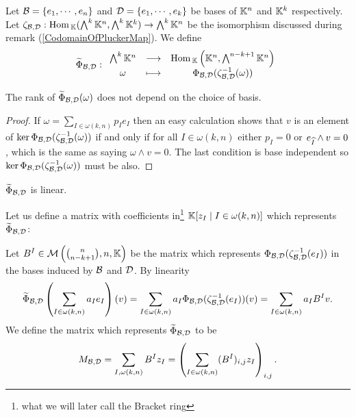 \begin{definition}
Let $\mathcal{B}=\left\{{e_1,\cdots, e_n}\right\}$ and $\mathcal{D}=\left\{{e_1,\cdots, e_k}\right\}$ be bases of $\mathbb{K}^n$ and $\mathbb{K}^k$ respectively. Let $\zeta_{\mathcal{B},\mathcal{D}}:\mathrm{Hom}\,_{\mathbb{K}}(\bigwedge^k\mathbb{K}^n,\bigwedge^k\mathbb{K}^k)\to\bigwedge^k\mathbb{K}^n$ be the isomorphism discussed during remark (\ref{CodomainOfPluckerMap}). We define
\[\widetilde{\Phi}_{\mathcal{B},\mathcal{D}}:\begin{array}{ccc} {\bigwedge^k\mathbb{K}^n} & \longrightarrow & { \mathrm{Hom}\,_{\mathbb{K}}\left({\mathbb{K}^n,\bigwedge^{n-k+1}\mathbb{K}^n}\right)}\\ {\omega} & \longmapsto & {\Phi_{\mathcal{B},\mathcal{D}}(\zeta_{\mathcal{B},\mathcal{D}}^{-1}(\omega))} \end{array}\]
\end{definition}

\begin{remark}
The rank of $\widetilde{\Phi}_{\mathcal{B},\mathcal{D}}(\omega)$ does not depend on the choice of basis.
\end{remark}
\begin{proof}
If $\omega=\sum_{I\in\omega(k,n)}p_Ie_I$ then an easy calculation shows that $v$ is an element of $\ker \Phi_{\mathcal{B},\mathcal{D}}(\zeta_{\mathcal{B},\mathcal{D}}^{-1}(\omega))$ if and only if for all $I\in \omega(k,n)$ either $p_I=0$ or $e_{\widehat{I}}\wedge v=0$, which is the same as saying $\omega\wedge v= 0$. The last condition is base independent so $\ker \Phi_{\mathcal{B},\mathcal{D}}(\zeta_{\mathcal{B},\mathcal{D}}^{-1}(\omega))$ must be also.
\end{proof}

\begin{remark}
$\widetilde{\Phi}_{\mathcal{B},\mathcal{D}}$ is linear.
\end{remark}



\noindent
Let us define a matrix with coefficients in\footnote{what we will later call the Bracket ring} $\mathbb{K}[z_I\mid I\in\omega(k,n)]$ which represents $\widetilde{\Phi}_{\mathcal{B},\mathcal{D}}$:\medskip

Let $B^I\in \mathcal{M}\left({\binom{n}{n-k+1},n,\mathbb{K}}\right)$ be the matrix which represents $\Phi_{\mathcal{B},\mathcal{D}}(\zeta_{\mathcal{B},\mathcal{D}}^{-1}(e_I))$ in the bases induced by $\mathcal{B}$ and $\mathcal{D}$. By linearity
\[\widetilde{\Phi}_{\mathcal{B},\mathcal{D}}\left({\sum_{I\in \omega(k,n)}a_I e_I}\right)(v)=\sum_{I\in \omega(k,n)}a_I \Phi_{\mathcal{B},\mathcal{D}}(\zeta_{\mathcal{B},\mathcal{D}}^{-1}(e_I))(v)=\sum_{I\in \omega(k,n)}a_I B^I v.\]
We define the matrix which represents $\widetilde{\Phi}_{\mathcal{B},\mathcal{D}}$ to be
\[M_{\mathcal{B},\mathcal{D}}=\sum_{I,\omega(k,n)}B^I z_I=\left({\sum_{I\in\omega(k,n)}(B^I)_{i,j}z_I}\right)_{i,j}.\]



